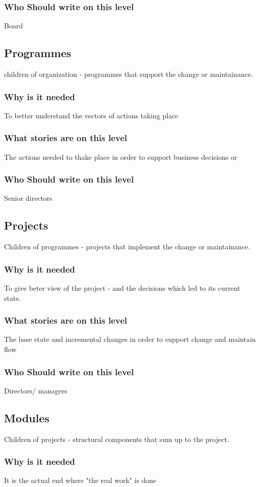 \documentclass[12pt,a4paper,twoside]{article}
\begin{document}
\subsubsection{Who Should write on this level}
Board
\subsection{Programmes}
children of organization - programmes that support the change or maintainance.
\subsubsection{Why is it needed}
To better understand the vectors of actions taking place
\subsubsection{What stories are on this level}
The actions needed to thake place in order to support business decisions or 
\subsubsection{Who Should write on this level}
Senior directors
\subsection{Projects}
Children of programmes - projects that implement the change or maintainance.
\subsubsection{Why is it needed}
To give beter view of the project - and the decisions which led to its current state. 
\subsubsection{What stories are on this level}
The base state and incremental changes in order to support change and maintain flow
\subsubsection{Who Should write on this level}
Directors/ managers
\subsection{Modules}
Children of projects - structural components that sum up to the project.
\subsubsection{Why is it needed}
It is the actual end where "the real work" is done
\end{document}
